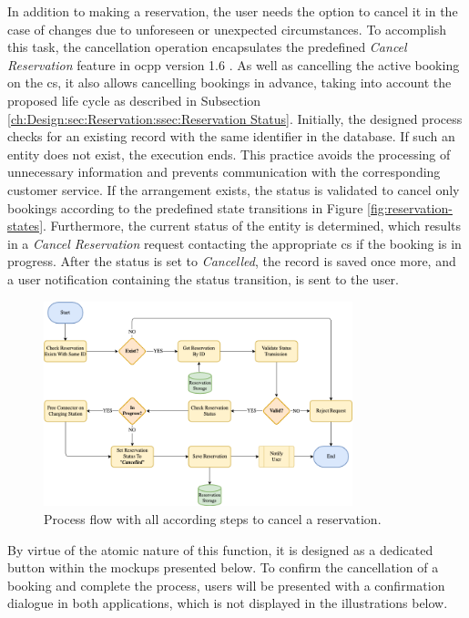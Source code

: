 In addition to making a reservation, the user needs the option to cancel it in the case of changes due to unforeseen or unexpected circumstances.
To accomplish this task, the cancellation operation encapsulates the predefined \textit{Cancel Reservation} feature in \acrshort{ocpp} version 1.6 \cite{noauthor_ocpp_nodate}. As well as cancelling the active booking on the \acrshort{cs}, it also allows cancelling bookings in advance, taking into account the proposed life cycle as described in Subsection \ref{ch:Design:sec:Reservation:ssec:Reservation Status}.
Initially, the designed process checks for an existing record with the same identifier in the database. If such an entity does not exist, the execution ends. This practice avoids the processing of unnecessary information and prevents communication with the corresponding customer service.
If the arrangement exists, the status is validated to cancel only bookings according to the predefined state transitions in Figure \ref{fig:reservation-states}. Furthermore, the current status of the entity is determined, which results in a \textit{Cancel Reservation} request contacting the appropriate \acrshort{cs} if the booking is in progress.
After the status is set to \textit{Cancelled}, the record is saved once more, and a user notification containing the status transition, is sent to the user.

\begin{figure}[h]
    \centering
    \includegraphics[width=0.8\textwidth,keepaspectratio]{resources/images/main/5_design/processes/ReservationCancel.png}
    \caption{Process flow with all according steps to cancel a reservation.}
    \label{fig:cancel-reservation-flowchart}
\end{figure}

\noindent By virtue of the atomic nature of this function, it is designed as a dedicated button within the mockups presented below. To confirm the cancellation of a booking and complete the process, users will be presented with a confirmation dialogue in both applications, which is not displayed in the illustrations below.

